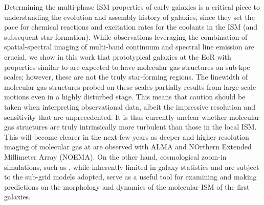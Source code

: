 \IfFileExists{emulateapjlegacy.cls}{\documentclass[iop]{emulateapjlegacy}}{\documentclass[iop]{emulateapj}}
\begin{document}
Determining the multi-phase ISM properties of early galaxies
is a critical piece to understanding the evolution and
assembly history of galaxies, since they set the pace
for chemical reactions and excitation rates for the coolants in the ISM (and subsequent star formation).
While observations leveraging the combination of spatial-spectral imaging of
multi-band continuum and spectral line emission are crucial,
we show in this work that prototypical galaxies at the EoR with properties similar to \flower
are expected to have molecular gas structures on sub-kpc scales; however, these are not
the truly star-forming regions. The linewidth of molecular gas structures probed on these scales partially results from
large-scale motions even in a highly disturbed stage.
This means that caution should be taken when interpreting observational data,
albeit the impressive resolution and sensitivity that are unprecedented.
It is thus currently unclear whether \highz molecular gas structures are truly intrinsically more turbulent than those in the local ISM.
This will become clearer in the next few years as deeper and higher resolution imaging of
molecular gas at \highz are observed with ALMA and NOrthern Extended Millimeter Array (NOEMA).
On the other hand, cosmological zoom-in simulations, such as , while inherently limited in galaxy
statistics and are subject to the sub-grid models adopted, serve as a useful tool for examining
and making predictions on the morphology and dynamics of the molecular ISM of the first galaxies.


\acknowledgements
\end{document}
